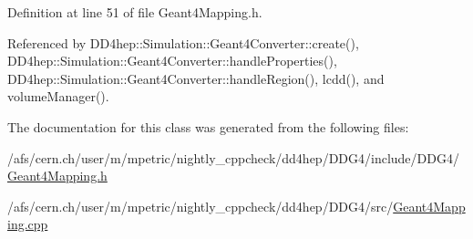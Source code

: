 Definition at line 51 of file Geant4\+Mapping.\+h.



Referenced by D\+D4hep\+::\+Simulation\+::\+Geant4\+Converter\+::create(), D\+D4hep\+::\+Simulation\+::\+Geant4\+Converter\+::handle\+Properties(), D\+D4hep\+::\+Simulation\+::\+Geant4\+Converter\+::handle\+Region(), lcdd(), and volume\+Manager().



The documentation for this class was generated from the following files\+:\begin{DoxyCompactItemize}
\item 
/afs/cern.\+ch/user/m/mpetric/nightly\+\_\+cppcheck/dd4hep/\+D\+D\+G4/include/\+D\+D\+G4/\hyperlink{_geant4_mapping_8h}{Geant4\+Mapping.\+h}\item 
/afs/cern.\+ch/user/m/mpetric/nightly\+\_\+cppcheck/dd4hep/\+D\+D\+G4/src/\hyperlink{_geant4_mapping_8cpp}{Geant4\+Mapping.\+cpp}\end{DoxyCompactItemize}
